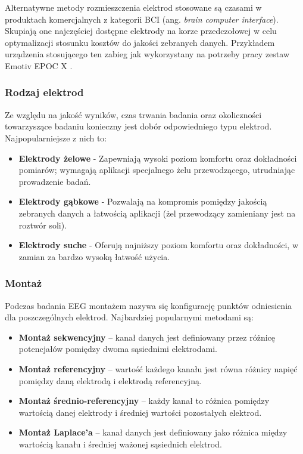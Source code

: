 \documentclass{./assets/wfis}
\begin{document}
Alternatywne metody rozmieszczenia elektrod stosowane są czasami w produktach komercjalnych z kategorii BCI (ang. \textit{brain computer interface}). Skupiają one najczęściej dostępne elektrody na korze przedczołowej w celu optymalizacji stosunku kosztów do jakości zebranych danych. Przykładem urządzenia stosującego ten zabieg jak wykorzystany na potrzeby pracy zestaw Emotiv EPOC X \cite{emotiv_inc_epoc_nodate}. 


\subsubsection{Rodzaj elektrod}
Ze względu na jakość wyników, czas trwania badania oraz okoliczności towarzyszące badaniu konieczny jest dobór odpowiedniego typu elektrod. Najpopularniejsze z nich to:

\begin{itemize}
    \item \textbf{Elektrody żelowe} - Zapewniają wysoki poziom komfortu oraz dokładności pomiarów; wymagają aplikacji specjalnego żelu przewodzącego, utrudniając prowadzenie badań.
    \item \textbf{Elektrody gąbkowe} - Pozwalają na kompromis pomiędzy jakością zebranych danych a łatwością aplikacji (żel przewodzący zamieniany jest na roztwór soli).
    \item \textbf{Elektrody suche} - Oferują najniższy poziom komfortu oraz dokładności, w zamian za bardzo wysoką łatwość użycia.
\end{itemize}

\subsubsection{Montaż}
Podczas badania EEG montażem nazywa się konfigurację punktów odniesienia dla poszczególnych elektrod. Najbardziej popularnymi metodami są:
\begin{itemize}
    \item \textbf{Montaż sekwencyjny} – kanał danych jest definiowany przez różnicę potencjałów pomiędzy dwoma sąsiednimi elektrodami.
    \item \textbf{Montaż referencyjny} – wartość każdego kanału jest równa różnicy napięć pomiędzy daną elektrodą i elektrodą referencyjną.
    \item \textbf{Montaż średnio-referencyjny} – każdy kanał to różnica pomiędzy wartością danej elektrody i średniej wartości pozostałych elektrod. 
    \item \textbf{Montaż Laplace’a} – kanał danych jest definiowany jako różnica między wartością kanału i średniej ważonej sąsiednich elektrod.
\end{itemize}
\end{document}
